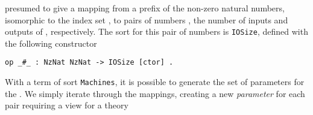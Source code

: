 \documentclass[copyright,creativecommons]{eptcs}
\begin{document}
\noindent
presumed to give a mapping from a prefix of the non-zero natural numbers,
isomorphic to the index set , to pairs of numbers , the number
of inputs and outputs of , respectively. The sort for this pair of numbers
is {\tt IOSize}, defined with the following constructor

\begin{center}
\begin{small}
\begin{boxedminipage}{0.50\textwidth}
\begin{verbatim}
op _#_ : NzNat NzNat -> IOSize [ctor] .
\end{verbatim}
\end{boxedminipage}
\end{small}
\end{center}

With a term of sort {\tt Machines}, it is possible to generate the set of
parameters for the .  We simply iterate through the mappings,
creating a new \emph{parameter} for each  pair requiring a view for
a theory 
\end{document}
